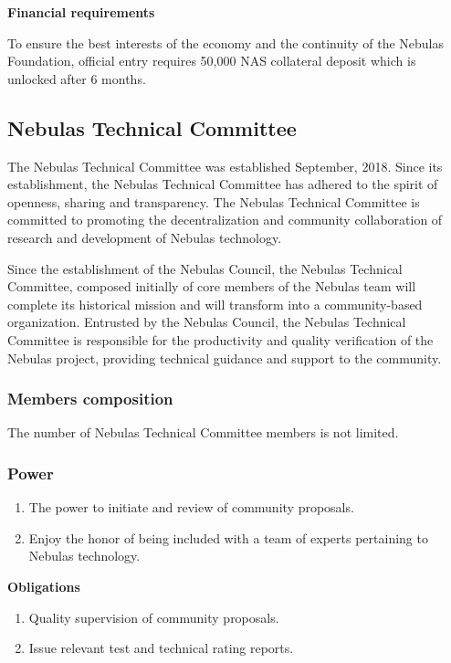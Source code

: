 \vspace{2em}

\textbf{Financial requirements}

To ensure the best interests of the economy and the continuity of the Nebulas Foundation, official entry requires 50,000 NAS collateral deposit which is unlocked after 6 months.

\subsection{Nebulas Technical Committee}

The Nebulas Technical Committee was established September, 2018. Since its establishment, the Nebulas Technical Committee has adhered to the spirit of openness, sharing and transparency. The Nebulas Technical Committee is committed to promoting the decentralization and community collaboration of research and development of Nebulas technology. 

Since the establishment of the Nebulas Council, the Nebulas Technical Committee, composed initially of core members of the Nebulas team will complete its historical mission and will transform into a community-based organization. Entrusted by the Nebulas Council, the Nebulas Technical Committee is responsible for the productivity and quality verification of the Nebulas project, providing technical guidance and support to the community.

\subsubsection{Members composition}

The number of Nebulas Technical Committee members is not limited.

\subsubsection{Power}

\begin{enumerate}
	\item The power to initiate and review of community proposals.
	\item Enjoy the honor of being included with a team of experts pertaining to Nebulas technology.
\end{enumerate}

\textbf{Obligations}

\begin{enumerate}
	\item Quality supervision of community proposals.
	\item Issue relevant test and technical rating reports.
\end{enumerate}

